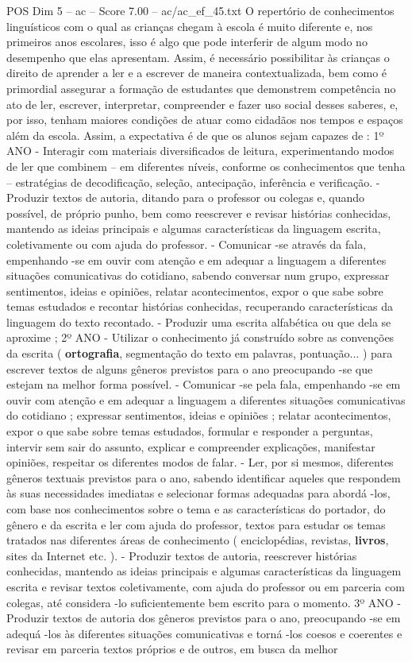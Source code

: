 \begin{textsample}{POS Dim 5 – ac – Score 7.00 – ac/ac\_ef\_45.txt}
O repertório de conhecimentos linguísticos com o qual as crianças chegam à escola é muito diferente e, nos primeiros anos escolares, isso é algo que pode interferir de algum modo no desempenho que elas apresentam.
Assim, é necessário possibilitar às crianças o direito de aprender a ler e a escrever de maneira contextualizada, bem como é primordial assegurar a formação de estudantes que demonstrem competência no ato de ler, escrever, interpretar, compreender e fazer uso social desses saberes, e, por isso, tenham maiores condições de atuar como cidadãos nos tempos e espaços além da escola.
Assim, a expectativa é de que os alunos sejam capazes de : 1º ANO - Interagir com materiais diversificados de leitura, experimentando modos de ler que combinem – em diferentes níveis, conforme os conhecimentos que tenha – estratégias de decodificação, seleção, antecipação, inferência e verificação. - Produzir textos de autoria, ditando para o professor ou colegas e, quando possível, de próprio punho, bem como reescrever e revisar histórias conhecidas, mantendo as ideias principais e algumas características da linguagem escrita, coletivamente ou com ajuda do professor. - Comunicar -se através da fala, empenhando -se em ouvir com atenção e em adequar a linguagem a diferentes situações comunicativas do cotidiano, sabendo conversar num grupo, expressar sentimentos, ideias e opiniões, relatar acontecimentos, expor o que sabe sobre temas estudados e recontar histórias conhecidas, recuperando características da linguagem do texto recontado. - Produzir uma escrita alfabética ou que dela se aproxime ; 2º ANO - Utilizar o conhecimento já construído sobre as convenções da escrita ( \textbf{ortografia}, segmentação do texto em palavras, pontuação... ) para escrever textos de alguns gêneros previstos para o ano preocupando -se que estejam na melhor forma possível. - Comunicar -se pela fala, empenhando -se em ouvir com atenção e em adequar a linguagem a diferentes situações comunicativas do cotidiano ; expressar sentimentos, ideias e opiniões ; relatar acontecimentos, expor o que sabe sobre temas estudados, formular e responder a perguntas, intervir sem sair do assunto, explicar e compreender explicações, manifestar opiniões, respeitar os diferentes modos de falar. - Ler, por si mesmos, diferentes gêneros textuais previstos para o ano, sabendo identificar aqueles que respondem às suas necessidades imediatas e selecionar formas adequadas para abordá -los, com base nos conhecimentos sobre o tema e as características do portador, do gênero e da escrita e ler com ajuda do professor, textos para estudar os temas tratados nas diferentes áreas de conhecimento ( enciclopédias, revistas, \textbf{livros}, sites da Internet etc. ). - Produzir textos de autoria, reescrever histórias conhecidas, mantendo as ideias principais e algumas características da linguagem escrita e revisar textos coletivamente, com ajuda do professor ou em parceria com colegas, até considera -lo suficientemente bem escrito para o momento. 3º ANO - Produzir textos de autoria dos gêneros previstos para o ano, preocupando -se em adequá -los às diferentes situações comunicativas e torná -los coesos e coerentes e revisar em parceria textos próprios e de outros, em busca da melhor 
\end{textsample}
